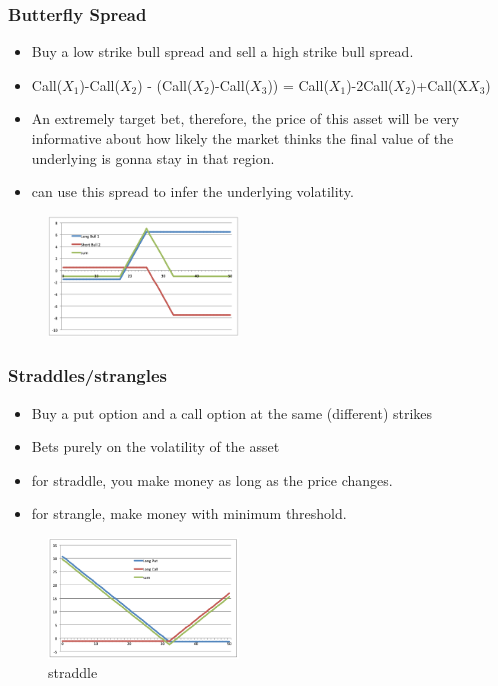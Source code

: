 \begin{multicols}{2}
\subsubsection{Butterfly Spread}
\begin{itemize}
    \item Buy a low strike bull spread and sell a high strike bull spread.
    \item Call($X_1$)-Call($X_2$) - (Call($X_2$)-Call($X_3$)) = Call($X_1$)-2Call($X_2$)+Call(X$X_3$)
    \item An extremely target bet, therefore, the price of this asset will be very informative about how likely the market thinks the final value of the underlying is gonna stay in that region.
    \item can use this spread to infer the underlying volatility.
\end{itemize}
\begin{figure}[H]
    \centering 
    \includegraphics[width =0.45\textwidth]{Figure/butter.png}
\end{figure}

\subsubsection{Straddles/strangles}
\begin{itemize}
    \item Buy a put option and a call option at the same (different) strikes
    \item Bets purely on the volatility of the asset
    \item for straddle, you make money as long as the price changes. 
    \item for strangle, make money with minimum threshold. 
\end{itemize}
\begin{figure}[H]
    \centering 
    \includegraphics[width =0.45\textwidth]{Figure/straddle.png}
    \caption*{straddle}
\end{figure}


\end{multicols}
